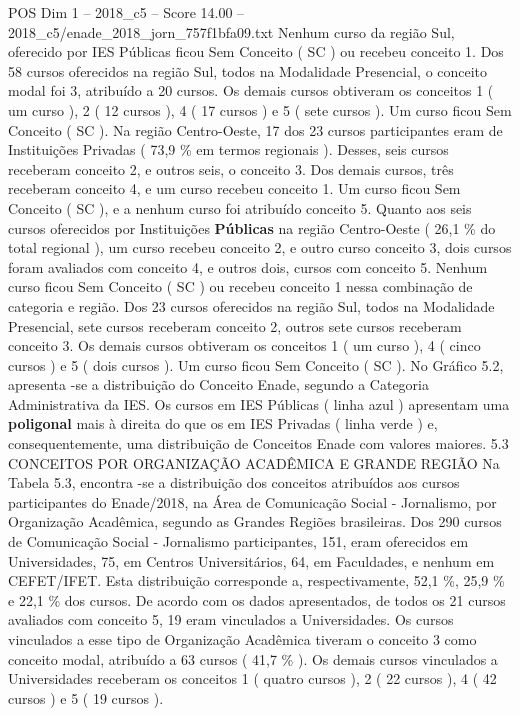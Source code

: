 \begin{textsample}{POS Dim 1 – 2018\_c5 – Score 14.00 – 2018\_c5/enade\_2018\_jorn\_757f1bfa09.txt}
Nenhum curso da região Sul, oferecido por IES Públicas ficou Sem Conceito ( SC ) ou recebeu conceito 1.
Dos 58 cursos oferecidos na região Sul, todos na Modalidade Presencial, o conceito modal foi 3, atribuído a 20 cursos.
Os demais cursos obtiveram os conceitos 1 ( um curso ), 2 ( 12 cursos ), 4 ( 17 cursos ) e 5 ( sete cursos ).
Um curso ficou Sem Conceito ( SC ).
Na região Centro-Oeste, 17 dos 23 cursos participantes eram de Instituições Privadas ( 73,9 \% em termos regionais ).
Desses, seis cursos receberam conceito 2, e outros seis, o conceito 3.
Dos demais cursos, três receberam conceito 4, e um curso recebeu conceito 1.
Um curso ficou Sem Conceito ( SC ), e a nenhum curso foi atribuído conceito 5.
Quanto aos seis cursos oferecidos por Instituições \textbf{Públicas} na região Centro-Oeste ( 26,1 \% do total regional ), um curso recebeu conceito 2, e outro curso conceito 3, dois cursos foram avaliados com conceito 4, e outros dois, cursos com conceito 5.
Nenhum curso ficou Sem Conceito ( SC ) ou recebeu conceito 1 nessa combinação de categoria e região.
Dos 23 cursos oferecidos na região Sul, todos na Modalidade Presencial, sete cursos receberam conceito 2, outros sete cursos receberam conceito 3.
Os demais cursos obtiveram os conceitos 1 ( um curso ), 4 ( cinco cursos ) e 5 ( dois cursos ).
Um curso ficou Sem Conceito ( SC ).
No Gráfico 5.2, apresenta -se a distribuição do Conceito Enade, segundo a Categoria Administrativa da IES.
Os cursos em IES Públicas ( linha azul ) apresentam uma \textbf{poligonal} mais à direita do que os em IES Privadas ( linha verde ) e, consequentemente, uma distribuição de Conceitos Enade com valores maiores. 5.3 CONCEITOS POR ORGANIZAÇÃO ACADÊMICA E GRANDE REGIÃO Na Tabela 5.3, encontra -se a distribuição dos conceitos atribuídos aos cursos participantes do Enade/2018, na Área de Comunicação Social - Jornalismo, por Organização Acadêmica, segundo as Grandes Regiões brasileiras.
Dos 290 cursos de Comunicação Social - Jornalismo participantes, 151, eram oferecidos em Universidades, 75, em Centros Universitários, 64, em Faculdades, e nenhum em CEFET/IFET.
Esta distribuição corresponde a, respectivamente, 52,1 \%, 25,9 \% e 22,1 \% dos cursos.
De acordo com os dados apresentados, de todos os 21 cursos avaliados com conceito 5, 19 eram vinculados a Universidades.
Os cursos vinculados a esse tipo de Organização Acadêmica tiveram o conceito 3 como conceito modal, atribuído a 63 cursos ( 41,7 \% ).
Os demais cursos vinculados a Universidades receberam os conceitos 1 ( quatro cursos ), 2 ( 22 cursos ), 4 ( 42 cursos ) e 5 ( 19 cursos ).

\end{textsample}
